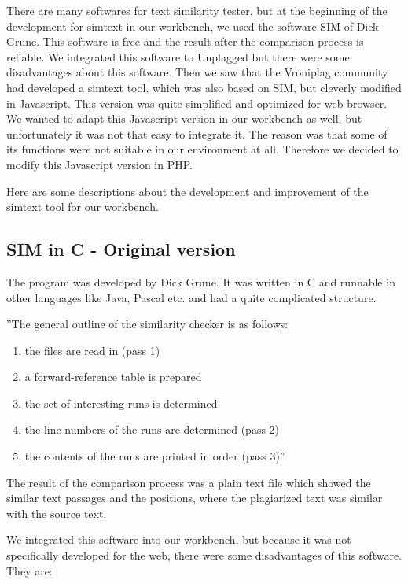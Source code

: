 There are many softwares for text similarity tester, but at the beginning of the development for simtext in our workbench, we used the software SIM of Dick Grune. This software is free and the result after the comparison process is reliable. We integrated this software to Unplagged but there were some disadvantages about this software. Then we saw that the Vroniplag community had developed a simtext tool, which was also based on SIM, but cleverly modified in Javascript. This version was quite simplified and optimized for web browser. We wanted to adapt this Javascript version in our workbench as well, but unfortunately it was not that easy to integrate it. The reason was that some of its functions were not suitable in our environment at all. Therefore we decided to modify this Javascript version in PHP. 

Here are some descriptions about the development and improvement of the simtext tool for our workbench.

\subsection{SIM in C - Original version}
The program was developed by Dick Grune. It was written in C and runnable in other languages like Java, Pascal etc. and had a quite complicated structure. 

''The general outline of the similarity checker is as follows:


\begin{enumerate}
\item the files are read in (pass 1)
\item a forward-reference table is prepared
\item the set of interesting runs is determined
\item the line numbers of the runs are determined (pass 2)
\item the contents of the runs are printed in order (pass 3)''
\end{enumerate}

The result of the comparison process was a plain text file which showed the similar text passages and the positions, where the plagiarized text was similar with the source text.

We integrated this software into our workbench, but because it was not specifically developed for the web, there were some disadvantages of this software. They are:

